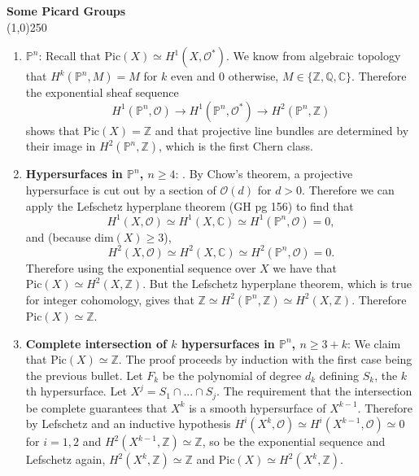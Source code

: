 \documentclass[10pt,letter]{article}
\begin{document}
\noindent 
\begin{center}
\textbf{Some Picard Groups} \\
\line(1,0){250}
\end{center}
\begin{enumerate}
\item {$\mathbb{P}^n$}: Recall that $\text{Pic}(X) \simeq H^{1}(X,\mathcal{O}^{\ast})$.  We know from algebraic topology that $H^k(\mathbb{P}^n,M) = M$ for $k$ even and $0$ otherwise, $M \in \lbrace \mathbb{Z}, \mathbb{Q}, \mathbb{C} \rbrace$.  Therefore the exponential sheaf sequence
\[ H^{1}(\mathbb{P}^n,\mathcal{O}) \rightarrow H^{1}(\mathbb{P}^n,\mathcal{O}^{\ast}) \rightarrow H^2(\mathbb{P}^n,\mathbb{Z})\] shows that $\text{Pic}(X) = \mathbb{Z}$ and that projective line bundles are determined by their image in $H^2(\mathbb{P}^n,\mathbb{Z})$, which is the first Chern class. 
\item {\bf Hypersurfaces in $\mathbb{P}^n$, $n \geq 4$}: . By Chow's theorem, a projective hypersurface is cut out by a section of $\mathcal{O}(d)$ for $d > 0$. Therefore we can apply the Lefschetz hyperplane theorem (GH pg 156) to find that \[ H^1(X,\mathcal{O}) \simeq H^1(X,\mathbb{C}) \simeq H^1(\mathbb{P}^n,\mathcal{O}) = 0,\]
and (because $\text{dim}(X) \geq 3$),
 \[ H^2(X,\mathcal{O}) \simeq H^2(X,\mathbb{C}) \simeq H^2(\mathbb{P}^n,\mathcal{O}) = 0.\]
Therefore using the exponential sequence over $X$ we have that $\text{Pic}(X) \simeq H^2(X,\mathbb{Z})$. But the Lefschetz hyperplane theorem, which is true for integer cohomology, gives that $\mathbb{Z} \simeq  H^2(\mathbb{P}^n,\mathbb{Z}) \simeq H^2(X,\mathbb{Z})$. Therefore $\text{Pic}(X)  \simeq \mathbb{Z}$.
\item {\bf Complete intersection of $k$ hypersurfaces in $\mathbb{P}^n$, $n \geq 3+k$}: We claim that $\text{Pic}(X) \simeq \mathbb{Z}$. The proof proceeds by induction with the first case being the previous bullet. Let $F_k$ be the polynomial of degree $d_k$ defining $S_k$, the $k$th hypersurface. Let $X^{j} = S_1 \cap ... \cap S_{j}$. The requirement that the intersection be complete guarantees that $X^k$ is a smooth hypersurface of $X^{k-1}$. Therefore by Lefschetz and an inductive hypothesis $H^i(X^k,\mathcal{O}) \simeq H^i(X^{k-1},\mathcal{O}) \simeq 0$ for $i = 1,2$ and $H^2(X^{k-1},\mathbb{Z}) \simeq \mathbb{Z}$, so be the exponential sequence and Lefschetz again, $H^2(X^{k},\mathbb{Z}) \simeq \mathbb{Z}$ and $\text{Pic}(X) \simeq H^2(X^{k},\mathbb{Z})$. 

\end{enumerate}
\end{document}
